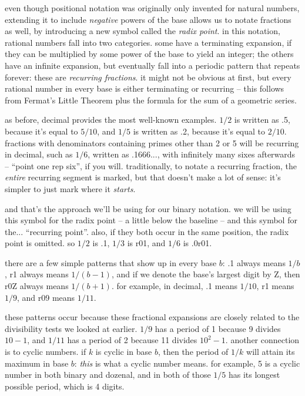 \documentclass[../best.tex]{subfiles}
\begin{document}

even though positional notation was originally only invented for natural numbers, extending it to include \emph{negative} powers of the base allows us to notate fractions as well, by introducing a new symbol called the {\it radix point}. in this notation, rational numbers fall into two categories. some have a terminating expansion, if they can be multiplied by some power of the base to yield an integer; the others have an infinite expansion, but eventually fall into a periodic pattern that repeats forever: these are {\it recurring fractions}. it might not be obvious at first, but every rational number in every base is either terminating or recurring -- this follows from Fermat's Little Theorem plus the formula for the sum of a geometric series.\myfootnote{}

as before, decimal provides the most well-known examples. $1/2$ is written as .5, because it's equal to $5/10$, and $1/5$ is written as .2, because it's equal to $2/10$. fractions with denominators containing primes other than 2 or 5 will be recurring in decimal, such as $1/6$, written as .1666..., with infinitely many sixes afterwards -- ``point one rep six'', if you will. traditionally, to notate a recurring fraction, the \emph{entire} recurring segment is marked, but that doesn't make a lot of sense: it's simpler to just mark where it \emph{starts}.

and that's the approach we'll be using for our binary notation. we will be using this symbol for the radix point -- a little below the baseline -- and this symbol for the... ``recurring point''. also, if they both occur in the same position, the radix point is omitted. so $1/2$ is .1, $1/3$ is r01, and $1/6$ is .0r01.

there are a few simple patterns that show up in every base $b$: .1 always means $1/b$, r1 always means $1/(b-1)$, and if we denote the base's largest digit by Z, then r0Z always means $1/(b+1)$. for example, in decimal, .1 means $1/10$, r1 means $1/9$, and r09 means $1/11$.

these patterns occur because these fractional expansions are closely related to the divisibility tests we looked at earlier. $1/9$ has a period of 1 because 9 divides $10 - 1$, and $1/11$ has a period of 2 because 11 divides $10^2 - 1$. another connection is to cyclic numbers. if $k$ is cyclic in base $b$, then the period of $1/k$ will attain its maximum in base $b$: \emph{this} is what a cyclic number means. for example, 5 is a cyclic number in both binary and dozenal, and in both of those $1/5$ has its longest possible period, which is 4 digits.\myfootnote{}
\end{document}
